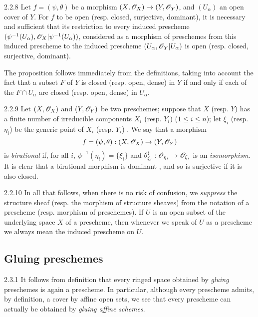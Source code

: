 \begin{envs}[Proposition]{2.2.8}
\label{prop-1.2.2.8}
Let $f=(\psi,\theta)$ be a morphism
$(X,\mathscr{O}_X)\to(Y,\mathscr{O}_Y)$, and $(U_\alpha)$ an open cover of $Y$. For $f$ to be
open (resp. closed, surjective, dominant), it is necessary and sufficient that
its restriction to every induced prescheme
$(\psi^{-1}(U_\alpha),\mathscr{O}_X|\psi^{-1}(U_\alpha))$, considered as a morphism of
preschemes from this induced prescheme to the induced prescheme
$(U_\alpha,\mathscr{O}_Y|U_\alpha)$ is open (resp. closed, surjective, dominant).
\end{envs}

The proposition follows immediately from the definitions, taking into
account the fact that a subset $F$ of $Y$ is closed (resp. open, dense) in $Y$
if and only if each of the $F\cap U_\alpha$ are closed (resp. open, dense) in
$U_\alpha$.

\begin{env}{2.2.9}
\label{env-1.2.2.9}
Let $(X,\mathscr{O}_X)$ and $(Y,\mathscr{O}_Y)$ be two preschemes; suppose that
$X$ (resp. $Y$) has a finite number of irreducible components $X_i$ (resp.
$Y_i$) ($1\leqslant i\leqslant n$); let $\xi_i$ (resp. $\eta_i$) be the generic
point of $X_i$ (resp. $Y_i$) . We say that a morphism
\[
  f=(\psi,\theta):(X,\mathscr{O}_X)\to(Y,\mathscr{O}_Y)
\]
is \emph{birational} if, for all $i$, $\psi^{-1}(\eta_i)=\{\xi_i\}$ and
$\theta_{\xi_i}^\sharp:\mathscr{O}_{\eta_i}\to\mathscr{O}_{\xi_i}$ is an \emph{isomorphism}. It
is clear that a birational morphism is dominant , and so is
surjective if it is also closed.
\end{env}

\begin{env}{2.2.10}
\label{rmk-1.2.2.10}
In all that follows, when there is
no risk of confusion, we \emph{suppress} the structure sheaf (resp. the morphism
of structure sheaves) from the notation of a prescheme (resp. morphism of
preschemes). If $U$ is an open subset of the underlying space $X$ of a
prescheme, then whenever we speak of $U$ as a prescheme we always mean the
induced prescheme on $U$.
\end{env}

\subsection{Gluing preschemes}
\label{1-schemes-2.3}

\begin{env}{2.3.1}
\label{env-1.2.3.1}
It follows from definition  that every ringed space obtained by
\emph{gluing} preschemes  is again a prescheme. In particular, although
every prescheme admits, by definition, a cover by affine open sets, we see that every
prescheme can actually be obtained by \emph{gluing affine schemes}.
\end{env}

